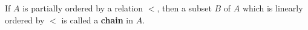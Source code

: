 If $A$ is partially ordered by a relation $<$, then a subset $B$ of $A$ which is linearly ordered by $<$ is called a \textbf{chain} in $A$.
